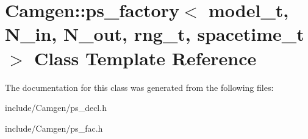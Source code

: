 \hypertarget{a00438}{\section{Camgen\-:\-:ps\-\_\-factory$<$ model\-\_\-t, N\-\_\-in, N\-\_\-out, rng\-\_\-t, spacetime\-\_\-t $>$ Class Template Reference}
\label{a00438}
}


The documentation for this class was generated from the following files\-:\begin{DoxyCompactItemize}
\item 
include/\-Camgen/ps\-\_\-decl.\-h\item 
include/\-Camgen/ps\-\_\-fac.\-h\end{DoxyCompactItemize}
